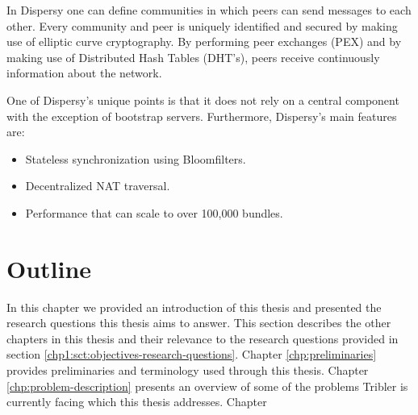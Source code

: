 In Dispersy one can define communities in which peers can send messages to each other.
Every community and peer is uniquely identified and secured by making use of elliptic curve cryptography.
By performing peer exchanges (PEX) and by making use of Distributed Hash Tables (DHT's), peers receive continuously information about the network.

One of Dispersy's unique points is that it does not rely on a central component with the exception of bootstrap servers.
Furthermore, Dispersy's main features are:
\begin{itemize}
	\item Stateless synchronization using Bloomfilters.
	\item Decentralized NAT traversal.
	\item Performance that can scale to over 100,000 bundles.
\end{itemize}


\section{Outline}
In this chapter we provided an introduction of this thesis and presented the research questions this thesis aims to answer. 
This section describes the other chapters in this thesis and their relevance to the research questions provided in section \ref{chp1:sct:objectives-research-questions}.
Chapter \ref{chp:preliminaries} provides preliminaries and terminology used through this thesis.
Chapter \ref{chp:problem-description} presents an overview of some of the problems Tribler is currently facing which this thesis addresses.
Chapter 
